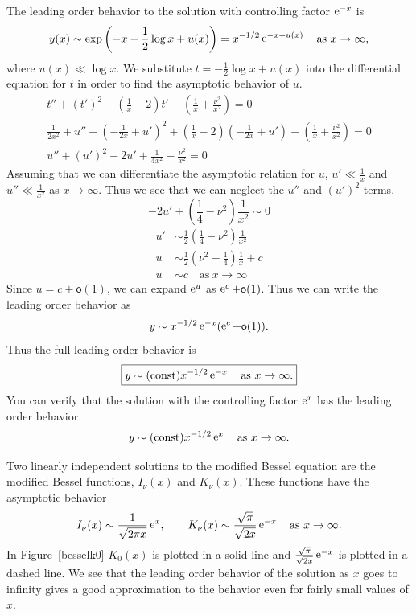 \begin{Example}
  The leading order behavior to the solution with controlling factor $\mathop{\mathrm{e}}\nolimits^{-x}$ is
  \[ y(x) \sim \exp\left(-x - \frac{1}{2} \log x + u(x) \right)
  = x^{-1/2} \mathop{\mathrm{e}}\nolimits^{-x + u(x)} \quad \mathrm{as}\ x \to \infty,\]
  where $u(x) \ll \log x$.
  We substitute $t = -\frac{1}{2} \log x + u(x)$ into the differential equation
  for $t$ in order to find the asymptotic behavior of $u$.
  \begin{gather*}
    t'' + (t')^2 + \left(\frac{1}{x} - 2\right) t' 
    - \left(\frac{1}{x} + \frac{\nu^2}{x^2}\right) = 0\\
    \frac{1}{2x^2} + u'' + \left(-\frac{1}{2x} + u'\right)^2 
    + \left(\frac{1}{x} - 2\right)
    \left(-\frac{1}{2x} + u'\right) 
    - \left(\frac{1}{x} + \frac{\nu^2}{x^2}\right) = 0 \\
    u'' + (u')^2 - 2u' + \frac{1}{4x^2} - \frac{\nu^2}{x^2} = 0
  \end{gather*}
  Assuming that we can differentiate the asymptotic relation for $u$,
  $u' \ll \frac{1}{x}$ and $u'' \ll \frac{1}{x^2}$ as $x \to \infty$.
  Thus we see that we can neglect the $u''$ and $(u')^2$ terms.
  \[ -2 u' + \left(\frac{1}{4} - \nu^2\right)\frac{1}{x^2} \sim 0 \]
  \begin{align*}
    u' &\sim \frac{1}{2} \left(\frac{1}{4} - \nu^2\right) \frac{1}{x^2} \\
    u &\sim \frac{1}{2} \left(\nu^2 -  \frac{1}{4} \right) \frac{1}{x} + c \\
    u &\sim c \quad \mathrm{as}\ x \to \infty
  \end{align*}
  Since $u = c + \mathsf{o}(1)$, we can expand $\mathop{\mathrm{e}}\nolimits^u$ as $\mathop{\mathrm{e}}\nolimits^c + \mathsf{o}(1)$.  
  Thus we can write the leading order behavior as
  \[ y \sim x^{-1/2} \mathop{\mathrm{e}}\nolimits^{-x} (\mathop{\mathrm{e}}\nolimits^c + \mathsf{o}(1)).\]
  Thus the full leading order behavior is
  \[ \boxed{y \sim (\mathrm{const})x^{-1/2} \mathop{\mathrm{e}}\nolimits^{-x} \quad \mathrm{as}\ x \to \infty.}\]
  You can verify that the solution with the controlling factor $\mathop{\mathrm{e}}\nolimits^x$ has
  the leading order behavior
  \[ y \sim (\mathrm{const}) x^{-1/2} \mathop{\mathrm{e}}\nolimits^x \quad \mathrm{as}\ x \to \infty. \]

  Two linearly independent solutions to the modified Bessel equation are the 
  modified Bessel functions, $I_\nu(x)$ and $K_\nu(x)$.  These functions
  have the asymptotic behavior
  \[ I_\nu(x) \sim \frac{1}{\sqrt{2\pi x}} \mathop{\mathrm{e}}\nolimits^x, 
  \qquad K_\nu(x) \sim \frac{\sqrt{\pi}}{\sqrt{2x}}
  \mathop{\mathrm{e}}\nolimits^{-x}\quad \mathrm{as}\ x \to \infty. \]
  In Figure~\ref{besselk0} $K_0(x)$ is plotted in a solid line and 
  $\frac{\sqrt{\pi}}{\sqrt{2x}} \mathop{\mathrm{e}}\nolimits^{-x}$ is plotted in a dashed line.  We see
  that the leading order behavior of the solution as $x$ goes to infinity
  gives a good approximation to the behavior even for fairly small values
  of $x$.


\end{Example}
